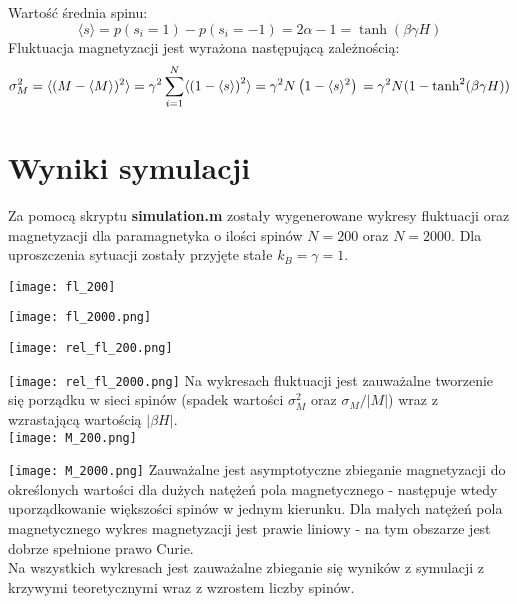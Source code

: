 \documentclass[a4paper,10pt]{article}
\begin{document}
	Wartość średnia spinu:
	\[ \langle s \rangle = p(s_i=1) - p(s_i=-1) = 2 \alpha -1 = \tanh (\beta \gamma H) \]
	Fluktuacja magnetyzacji jest wyrażona następującą zależnością\cite{af}:
	\begin{equation}
	\label{fluktuacja}
	\sigma_{M}^{2} = \langle (M-\langle M \rangle)^{2}\rangle \\ = \gamma^{2} \sum^{N}_{i=1} \langle \left( 1-\langle s \rangle \right)^{2} \rangle  = \gamma^{2} N  \left( 1 - \langle s \rangle^{2} \right) \\ = \gamma^{2} N (1-\tanh^{2} (\beta \gamma H))
	\end{equation}
	\section{Wyniki symulacji}
	Za pomocą skryptu {\bf simulation.m } zostały wygenerowane wykresy fluktuacji oraz magnetyzacji dla paramagnetyka o ilości spinów $N=200$ oraz $N=2000$. Dla uproszczenia sytuacji zostały przyjęte stałe $k_{B}=\gamma=1$.
	

		\texttt{[image: fl\_200]}

		\texttt{[image: fl\_2000.png]}
		
		\texttt{[image: rel\_fl\_200.png]}

		\texttt{[image: rel\_fl\_2000.png]}
	Na wykresach fluktuacji jest zauważalne tworzenie się porządku w sieci spinów (spadek wartości $\sigma_{M}^{2}$ oraz $\sigma_{M}/|M|$) wraz z wzrastającą wartością $|\beta H|$.\\
		\texttt{[image: M\_200.png]}

		\texttt{[image: M\_2000.png]}
	Zauważalne jest asymptotyczne zbieganie magnetyzacji do określonych wartości dla dużych natężeń pola magnetycznego - następuje wtedy uporządkowanie większości spinów w jednym kierunku. Dla małych natężeń pola magnetycznego wykres magnetyzacji jest prawie liniowy - na tym obszarze jest dobrze spełnione prawo Curie.\\
	Na wszystkich wykresach jest zauważalne zbieganie się wyników z symulacji z krzywymi teoretycznymi wraz z wzrostem liczby spinów.
\end{document}
